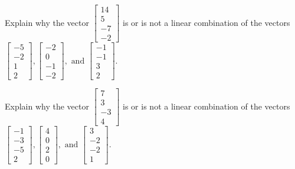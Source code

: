 \documentclass{article}
\begin{document}
\begin{exerciseStatement}
    Explain why the vector \(\left[\begin{array}{c}
14 \\
5 \\
-7 \\
-2
\end{array}\right]\)  is or is not a linear
combination of the vectors \(\left[\begin{array}{c}
-5 \\
-2 \\
1 \\
2
\end{array}\right] , \left[\begin{array}{c}
-2 \\
0 \\
-1 \\
-2
\end{array}\right] , \text{ and } \left[\begin{array}{c}
-1 \\
-1 \\
3 \\
2
\end{array}\right]\).



  
\end{exerciseStatement}

\begin{exerciseStatement}
    Explain why the vector \(\left[\begin{array}{c}
7 \\
3 \\
-3 \\
4
\end{array}\right]\)  is or is not a linear
combination of the vectors \(\left[\begin{array}{c}
-1 \\
-3 \\
-5 \\
2
\end{array}\right] , \left[\begin{array}{c}
4 \\
0 \\
2 \\
0
\end{array}\right] , \text{ and } \left[\begin{array}{c}
3 \\
-2 \\
-2 \\
1
\end{array}\right]\).



  
\end{exerciseStatement}
\end{document}
